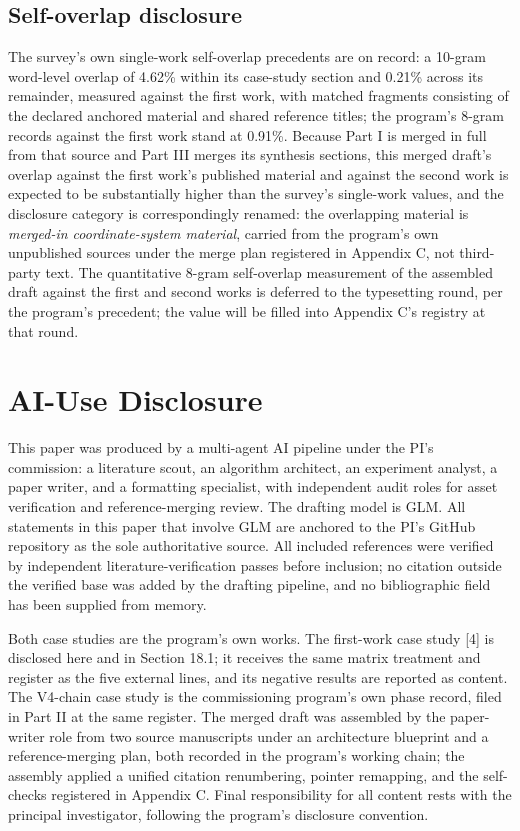 \documentclass[11pt]{article}
\begin{document}
\subsection{Self-overlap disclosure}
\noindent The survey's own single-work self-overlap precedents are on record: a 10-gram word-level overlap of 4.62\% within its case-study section and 0.21\% across its remainder, measured against the first work, with matched fragments consisting of the declared anchored material and shared reference titles; the program's 8-gram records against the first work stand at 0.91\%. Because Part I is merged in full from that source and Part III merges its synthesis sections, this merged draft's overlap against the first work's published material and against the second work is expected to be substantially higher than the survey's single-work values, and the disclosure category is correspondingly renamed: the overlapping material is \emph{merged-in coordinate-system material}, carried from the program's own unpublished sources under the merge plan registered in Appendix C, not third-party text. The quantitative 8-gram self-overlap measurement of the assembled draft against the first and second works is deferred to the typesetting round, per the program's precedent; the value will be filled into Appendix C's registry at that round.\par
\section{AI-Use Disclosure}
\label{sec:23}
\noindent This paper was produced by a multi-agent AI pipeline under the PI's commission: a literature scout, an algorithm architect, an experiment analyst, a paper writer, and a formatting specialist, with independent audit roles for asset verification and reference-merging review. The drafting model is GLM. All statements in this paper that involve GLM are anchored to the PI's GitHub repository as the sole authoritative source. All included references were verified by independent literature-verification passes before inclusion; no citation outside the verified base was added by the drafting pipeline, and no bibliographic field has been supplied from memory.\par
\noindent Both case studies are the program's own works. The first-work case study [4] is disclosed here and in Section 18.1; it receives the same matrix treatment and register as the five external lines, and its negative results are reported as content. The V4-chain case study is the commissioning program's own phase record, filed in Part II at the same register. The merged draft was assembled by the paper-writer role from two source manuscripts under an architecture blueprint and a reference-merging plan, both recorded in the program's working chain; the assembly applied a unified citation renumbering, pointer remapping, and the self-checks registered in Appendix C. Final responsibility for all content rests with the principal investigator, following the program's disclosure convention.\par
\end{document}
